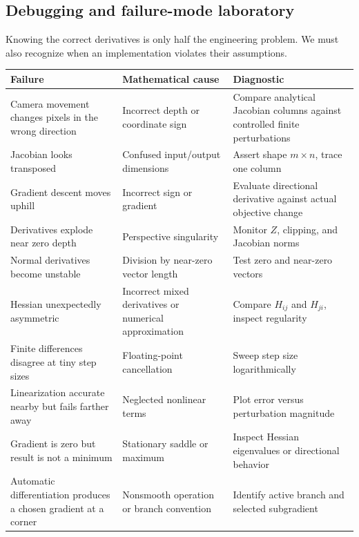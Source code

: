 \subsection{Debugging and failure-mode laboratory}\label{02-foundations-ii-ch021-debugging-and-failure-mode-laboratory}

\hypertarget{02-foundations-ii-ch021-debugging-and-failure-mode-laboratory}{}

Knowing the correct derivatives is only half the engineering problem. We must also recognize when an implementation violates their assumptions.

{\def\LTcaptype{none} %
\begin{longtable}[]{@{}
  >{\raggedright\arraybackslash}p{}
  >{\raggedright\arraybackslash}p{}
  >{\raggedright\arraybackslash}p{}@{}}
\toprule\noalign{}
\begin{minipage}[b]{\linewidth}\raggedright
Failure
\end{minipage} & \begin{minipage}[b]{\linewidth}\raggedright
Mathematical cause
\end{minipage} & \begin{minipage}[b]{\linewidth}\raggedright
Diagnostic
\end{minipage} \\
\midrule\noalign{}
\endhead
\bottomrule\noalign{}
\endlastfoot
Camera movement changes pixels in the wrong direction & Incorrect depth or coordinate sign & Compare analytical Jacobian columns against controlled finite perturbations \\
Jacobian looks transposed & Confused input/output dimensions & Assert shape \(m\times n\), trace one column \\
Gradient descent moves uphill & Incorrect sign or gradient & Evaluate directional derivative against actual objective change \\
Derivatives explode near zero depth & Perspective singularity & Monitor \(Z\), clipping, and Jacobian norms \\
Normal derivatives become unstable & Division by near-zero vector length & Test zero and near-zero vectors \\
Hessian unexpectedly asymmetric & Incorrect mixed derivatives or numerical approximation & Compare \(H_{ij}\) and \(H_{ji}\), inspect regularity \\
Finite differences disagree at tiny step sizes & Floating-point cancellation & Sweep step size logarithmically \\
Linearization accurate nearby but fails farther away & Neglected nonlinear terms & Plot error versus perturbation magnitude \\
Gradient is zero but result is not a minimum & Stationary saddle or maximum & Inspect Hessian eigenvalues or directional behavior \\
Automatic differentiation produces a chosen gradient at a corner & Nonsmooth operation or branch convention & Identify active branch and selected subgradient \\
\end{longtable}
}

